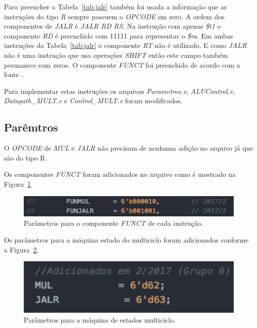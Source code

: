 \documentclass[12pt]{article}
\begin{document}
Para preencher a Tabela~\ref{tab:jalr} também foi usada a informação que as instruções do tipo \textit{R} sempre possuem o \textit{OPCODE} em zero. A ordem dos componentes de \textit{JALR} é \textit{JALR RD RS}. Na instrução com apenas \textit{\$t1} o componente \textit{RD} é preenchido com 11111 para representar o \textit{\$ra}. Em ambas instruções da Tabela~\ref{tab:jalr} o componente \textit{RT} não é utilizado. E como \textit{JALR} não é uma instrução que usa operações \textit{SHIFT} então este campo também permanece com zeros. O componente \textit{FUNCT} foi preenchido de acordo com a fonte \cite{mips32}.

Para implementar estas instruções os arquivos \textit{Parametros.v}, \textit{ALUControl.v}, \textit{Datapath\_MULT.v} e \textit{Control\_MULT.v} foram modificados. 

\subsection{Parêmtros}
\label{subsec:param}

O \textit{OPCODE} de \textit{MUL} e \textit{JALR} não precisam de nenhuma adição no arquivo já que são do tipo R.

Os componentes \textit{FUNCT} foram adicionados no arquivo como é mostrado na Figura~\ref{fig:pfunct}.

\begin{figure}[H]
	\flushleft
	\includegraphics[width=1\textwidth]{pfunct.png}
	\caption{Parâmetros para o componente \textit{FUNCT} de cada instrução.}
	\label{fig:pfunct}
\end{figure}

Os parâmetros para a máquina estado do multiciclo foram adicionados conforme a Figura~\ref{fig:pest}.

\begin{figure}[H]
	\flushleft
	\includegraphics[width=1\textwidth]{pest.png}
	\caption{Parâmetros para a máquina de estados multiciclo.}
	\label{fig:pest}
\end{figure}
\end{document}
